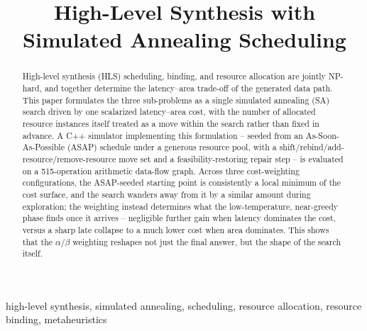 \documentclass[conference]{IEEEtran}
\begin{document}
    \title{High-Level Synthesis with Simulated Annealing Scheduling}

    \author{
    }


    \maketitle
    \thispagestyle{plain}
    \pagestyle{plain}
    \setcounter{page}{1}

    \begin{abstract}
        High-level synthesis (HLS) scheduling, binding, and resource allocation are jointly NP-hard,
        and together determine the latency--area trade-off of the generated data path. This paper
        formulates the three sub-problems as a single simulated annealing (SA) search driven by one
        scalarized latency--area cost, with the number of allocated resource instances itself treated
        as a move within the search rather than fixed in advance. A C++ simulator implementing this
        formulation -- seeded from an As-Soon-As-Possible (ASAP) schedule under a generous resource
        pool, with a shift/rebind/add-resource/remove-resource move set and a feasibility-restoring
        repair step -- is evaluated on a 515-operation arithmetic data-flow graph. Across three
        cost-weighting configurations, the ASAP-seeded starting point is consistently a local minimum
        of the cost surface, and the search wanders away from it by a similar amount during
        exploration; the weighting instead determines what the low-temperature, near-greedy phase
        finds once it arrives -- negligible further gain when latency dominates the cost, versus a
        sharp late collapse to a much lower cost when area dominates. This shows that the
        $\alpha/\beta$ weighting reshapes not just the final answer, but the shape of the search
        itself.
    \end{abstract}

    \begin{IEEEkeywords}
        high-level synthesis, simulated annealing, scheduling, resource allocation, resource binding,
        metaheuristics
    \end{IEEEkeywords}

    \vspace{0.5em}
\end{document}
